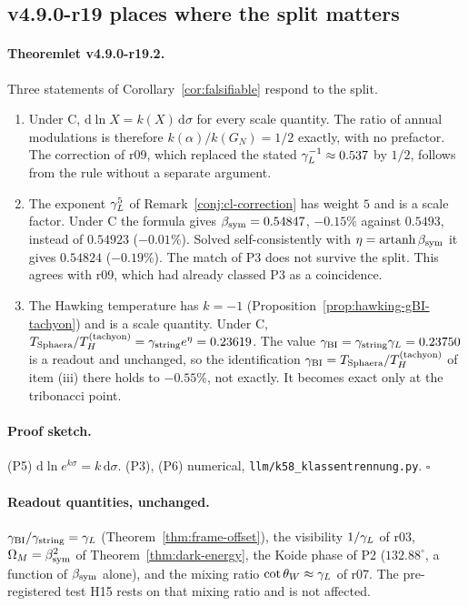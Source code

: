 \subsection*{v4.9.0-r19 places where the split matters}
\label{subsec:v490-r19-matters}

\paragraph{Theoremlet v4.9.0-r19.2.}
Three statements of Corollary~\ref{cor:falsifiable} respond to the split.
\begin{enumerate}[leftmargin=2em]
\item[(P5)] Under C, \(\mathrm d\ln X=k(X)\,\mathrm d\sigma\) for every scale quantity.  The ratio of annual modulations is therefore
\(k(\alpha)/k(G_N)=1/2\) exactly, with no prefactor.  The correction of r09, which replaced the stated \(\gamma_L^{-1}\approx0.537\) by
\(1/2\), follows from the rule without a separate argument.
\item[(P3)] The exponent \(\gamma_L^5\) of Remark~\ref{conj:cl-correction} has weight \(5\) and is a scale factor.  Under C the formula gives
\(\beta_{\mathrm{sym}}=0.54847\), \(-0.15\%\) against \(0.5493\), instead of \(0.54923\) (\(-0.01\%\)).  Solved self-consistently with
\(\eta=\operatorname{artanh}\beta_{\mathrm{sym}}\) it gives \(0.54824\) (\(-0.19\%\)).  The match of P3 does not survive the split.  This agrees with r09,
which had already classed P3 as a coincidence.
\item[(P6)] The Hawking temperature has \(k=-1\) (Proposition~\ref{prop:hawking-gBI-tachyon}) and is a scale quantity.  Under C,
\(T_{\rm Sphaera}/T_H^{(\mathrm{tachyon})}=\gamma_{\mathrm{string}} e^\eta=0.23619\).  The value \(\gamma_{\mathrm{BI}}=\gamma_{\mathrm{string}}\gamma_L=0.23750\) is a readout and
unchanged, so the identification \(\gamma_{\mathrm{BI}}=T_{\rm Sphaera}/T_H^{(\mathrm{tachyon})}\) of item (iii) there holds to \(-0.55\%\), not
exactly.  It becomes exact only at the tribonacci point.
\end{enumerate}

\paragraph{Proof sketch.}
(P5) \(\mathrm d\ln e^{k\sigma}=k\,\mathrm d\sigma\).  (P3), (P6) numerical, \texttt{llm/k58\_klassentrennung.py}.  \(\square\)

\paragraph{Readout quantities, unchanged.}
\(\gamma_{\mathrm{BI}}/\gamma_{\mathrm{string}}=\gamma_L\) (Theorem~\ref{thm:frame-offset}), the visibility \(1/\gamma_L\) of r03, \(\Omega_M=\beta_{\mathrm{sym}}^2\) of
Theorem~\ref{thm:dark-energy}, the Koide phase of P2 (\(132.88^\circ\), a function of \(\beta_{\mathrm{sym}}\) alone), and the mixing ratio
\(\cot\theta_W\approx\gamma_L\) of r07.  The pre-registered test H15 rests on that mixing ratio and is not affected.


